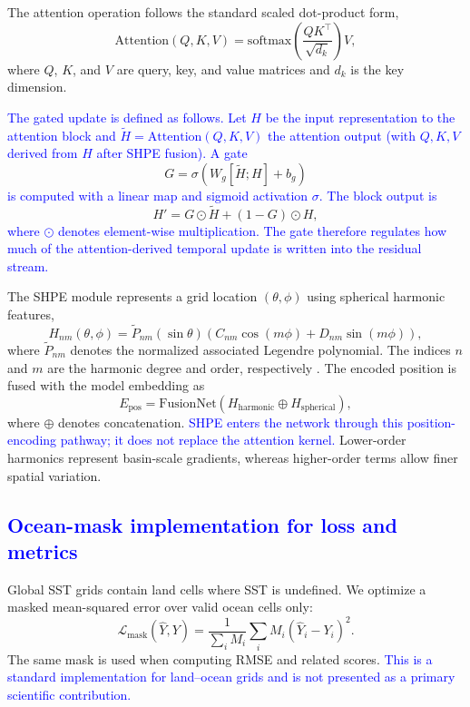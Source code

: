 \documentclass[published]{agujournal2025}
\newcommand{\rev}[1]{\textcolor{blue}{#1}}
\begin{document}
The attention operation follows the standard scaled dot-product form,
\begin{equation}
    \mathrm{Attention}(Q,K,V) = \mathrm{softmax}\left(\frac{QK^{\top}}{\sqrt{d_k}}\right)V,
\end{equation}
where $Q$, $K$, and $V$ are query, key, and value matrices and $d_k$ is the key dimension\cite{vaswani2017attention}.

\rev{The gated update is defined as follows. Let $H$ be the input representation to the attention block and $\tilde{H}=\mathrm{Attention}(Q,K,V)$ the attention output (with $Q,K,V$ derived from $H$ after SHPE fusion). A gate}
\begin{equation}
    G = \sigma\left(W_g[\tilde{H};H]+b_g\right)
\end{equation}
\rev{is computed with a linear map and sigmoid activation $\sigma$. The block output is}
\begin{equation}
    H' = G \odot \tilde{H} + (1-G)\odot H,
\end{equation}
\rev{where $\odot$ denotes element-wise multiplication. The gate therefore regulates how much of the attention-derived temporal update is written into the residual stream.}

The SHPE module represents a grid location $(\theta,\phi)$ using spherical harmonic features,
\begin{equation}
    H_{nm}(\theta,\phi) = \tilde{P}_{nm}(\sin\theta) \left(C_{nm}\cos(m\phi) + D_{nm}\sin(m\phi)\right),
\end{equation}
where $\tilde{P}_{nm}$ denotes the normalized associated Legendre polynomial. The indices $n$ and $m$ are the harmonic degree and order, respectively \cite{xing2019different,chen2021high}. The encoded position is fused with the model embedding as
\begin{equation}
    E_{\mathrm{pos}} = \mathrm{FusionNet}\left(H_{\mathrm{harmonic}} \oplus H_{\mathrm{spherical}}\right),
\end{equation}
where $\oplus$ denotes concatenation\cite{hazirbas2016fusenet}. \rev{SHPE enters the network through this position-encoding pathway; it does not replace the attention kernel.} Lower-order harmonics represent basin-scale gradients, whereas higher-order terms allow finer spatial variation.

\subsection{\rev{Ocean-mask implementation for loss and metrics}}
Global SST grids contain land cells where SST is undefined. We optimize a masked mean-squared error over valid ocean cells only:
\begin{equation}
    \mathcal{L}_{\mathrm{mask}}(\hat{Y},Y) =
    \frac{1}{\sum_i M_i}\sum_i M_i\left(\hat{Y}_i - Y_i\right)^2.
\end{equation}
The same mask is used when computing RMSE and related scores. \rev{This is a standard implementation for land--ocean grids and is not presented as a primary scientific contribution.}
\end{document}
